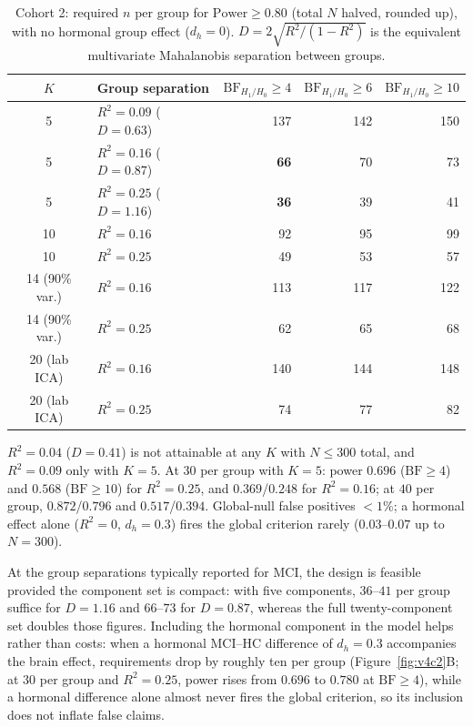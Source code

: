 \documentclass[11pt,a4paper]{article}
\newcommand{\BF}{\mathrm{BF}}
\begin{document}
\begin{table}[H]
\centering\small
\caption{Cohort 2: required $n$ per group for $\mathrm{Power}\ge0.80$ (total $N$ halved, rounded up), with no hormonal group effect ($d_h=0$). $D=2\sqrt{R^{2}/(1-R^{2})}$ is the equivalent multivariate Mahalanobis separation between groups.}
\label{tab:v4c2}
\begin{tabular}{clrrr}
\toprule
$K$ & Group separation & $\BF_{H_1/H_0}\ge4$ & $\BF_{H_1/H_0}\ge6$ & $\BF_{H_1/H_0}\ge10$\\
\midrule
\rowcolor{RowGrey}
5 & $R^2=0.09$ ($D=0.63$) & 137 & 142 & 150\\
\rowcolor{RowGrey}
5 & $R^2=0.16$ ($D=0.87$) & \textbf{66} & 70 & 73\\
\rowcolor{RowGrey}
5 & $R^2=0.25$ ($D=1.16$) & \textbf{36} & 39 & 41\\
10 & $R^2=0.16$ & 92 & 95 & 99\\
10 & $R^2=0.25$ & 49 & 53 & 57\\
14 (90\% var.) & $R^2=0.16$ & 113 & 117 & 122\\
14 (90\% var.) & $R^2=0.25$ & 62 & 65 & 68\\
20 (lab ICA) & $R^2=0.16$ & 140 & 144 & 148\\
20 (lab ICA) & $R^2=0.25$ & 74 & 77 & 82\\
\bottomrule
\end{tabular}

\vspace{2pt}
{\footnotesize $R^{2}=0.04$ ($D=0.41$) is not attainable at any $K$ with $N\le300$ total, and $R^{2}=0.09$ only with $K=5$. At $30$ per group with $K=5$: power $0.696$ ($\BF\ge4$) and $0.568$ ($\BF\ge10$) for $R^{2}=0.25$, and $0.369$/$0.248$ for $R^{2}=0.16$; at $40$ per group, $0.872$/$0.796$ and $0.517$/$0.394$. Global-null false positives $<1\%$; a hormonal effect alone ($R^{2}=0$, $d_h=0.3$) fires the global criterion rarely ($0.03$--$0.07$ up to $N=300$).}
\end{table}

At the group separations typically reported for MCI, the design is feasible provided the component set is compact: with five components, $36$--$41$ per group suffice for $D=1.16$ and $66$--$73$ for $D=0.87$, whereas the full twenty-component set doubles those figures. Including the hormonal component in the model helps rather than costs: when a hormonal MCI--HC difference of $d_h=0.3$ accompanies the brain effect, requirements drop by roughly ten per group (Figure~\ref{fig:v4c2}B; at $30$ per group and $R^{2}=0.25$, power rises from $0.696$ to $0.780$ at $\BF\ge4$), while a hormonal difference alone almost never fires the global criterion, so its inclusion does not inflate false claims.
\end{document}
